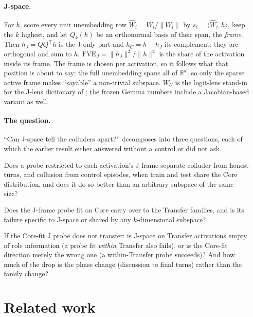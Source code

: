 \documentclass[11pt,a4paper]{article}
\newcommand{\WU}{W_U}
\newcommand{\hJ}{h_J}
\newcommand{\hC}{h_C}
\begin{document}
\paragraph{J-space.} For $h$, score every unit unembedding row $\hat{W}_i = W_i/\|W_i\|$ by $s_i=\langle\hat W_i,h\rangle$, keep the $k$ highest, and let $Q_k(h)$ be an orthonormal basis of their span, the \emph{frame}. Then $\hJ = Q Q^{\top}h$ is the J-only part and $\hC=h-\hJ$ its complement; they are orthogonal and sum to $h$. $\mathrm{FVE}_J=\|\hJ\|^2/\|h\|^2$ is the share of the activation inside its frame. The frame is chosen per activation, so it follows what that position is about to say; the full unembedding spans all of $\mathbb{R}^d$, so only the sparse active frame makes ``sayable'' a non-trivial subspace. $\WU$ is the logit-lens stand-in for the J-lens dictionary of \citet{gurnee2026verbalizable}; the frozen Gemma numbers include a Jacobian-based variant as well.

\paragraph{The question.} ``Can J-space tell the colluders apart?'' decomposes into three questions, each of which the earlier result either answered without a control or did not ask.

\begin{description}[style=nextline,leftmargin=1.2em,font=\normalfont\bfseries]
\item[Q1, in distribution.] Does a probe restricted to each activation's J-frame separate colluder from honest turns, and collusion from control episodes, when train and test share the Core distribution, and does it do so better than an arbitrary subspace of the same size?
\item[Q2, transfer.] Does the J-frame probe fit on Core carry over to the Transfer families, and is its failure specific to J-space or shared by any $k$-dimensional subspace?
\item[Q3, what fails.] If the Core-fit J probe does not transfer: is J-space on Transfer activations empty of role information (a probe fit \emph{within} Transfer also fails), or is the Core-fit direction merely the wrong one (a within-Transfer probe succeeds)? And how much of the drop is the phase change (discussion to final turns) rather than the family change?
\end{description}

\section{Related work}
\label{sec:related}
\end{document}
